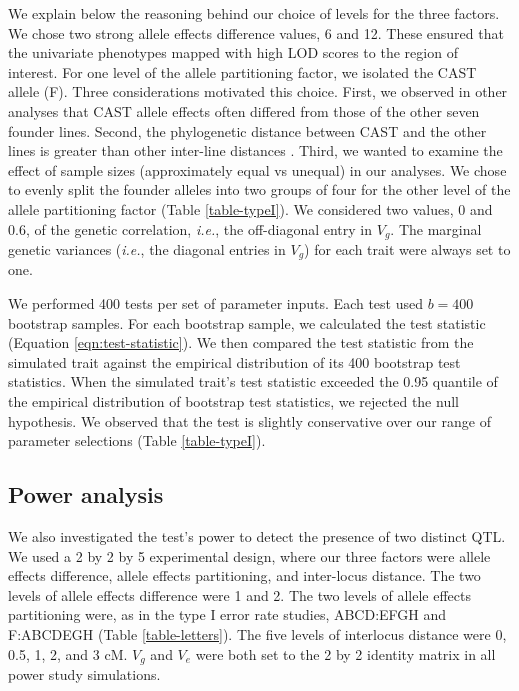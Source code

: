 \documentclass[12pt,twoside, lineno]{gsajnl}
\begin{document}
We explain below the reasoning behind our choice of levels for the three factors. We chose two strong allele effects difference values, 6 and 12. These ensured that the univariate phenotypes mapped with high LOD scores to the region of interest. For one level of the allele partitioning factor, we isolated the CAST allele (F). Three considerations motivated this choice. First, we observed in other analyses that CAST allele effects often differed from those of the other seven founder lines. Second, the phylogenetic distance between CAST and the other lines is greater than other inter-line distances \citep{didion2013deconstructing}. Third, we wanted to examine the effect of sample sizes (approximately equal vs unequal) in our analyses.  We chose to evenly split the founder alleles into two groups of four for the other level of the allele partitioning factor (Table \ref{table-typeI}). We considered two values, 0 and 0.6, of the genetic correlation, \textit{i.e.}, the off-diagonal entry in $V_g$. The marginal genetic variances (\textit{i.e.}, the diagonal entries in $V_g$) for each trait were always set to one.  

We performed 400 tests per set of parameter inputs. Each test used $b = 400$ bootstrap samples. For each bootstrap sample, we calculated the test statistic (Equation \ref{eqn:test-statistic}). We then compared the test statistic from the simulated trait against the empirical distribution of its 400 bootstrap test statistics. When the simulated trait's test statistic exceeded the 0.95 quantile of the empirical distribution of bootstrap test statistics, we rejected the null hypothesis. We observed that the test is slightly conservative over our range of parameter selections (Table \ref{table-typeI}). 


\subsection{Power analysis}

We also investigated the test's power to detect the presence of two distinct QTL. We used a 2 by 2 by 5 experimental design, where our three factors were allele effects difference, allele effects partitioning, and inter-locus distance. The two levels of allele effects difference were 1 and 2. The two levels of allele effects partitioning were, as in the type I error rate studies, ABCD:EFGH and F:ABCDEGH (Table \ref{table-letters}). The five levels of interlocus distance were 0, 0.5, 1, 2, and 3 cM. $V_g$ and $V_e$ were both set to the 2 by 2 identity matrix in all power study simulations. 
\end{document}
